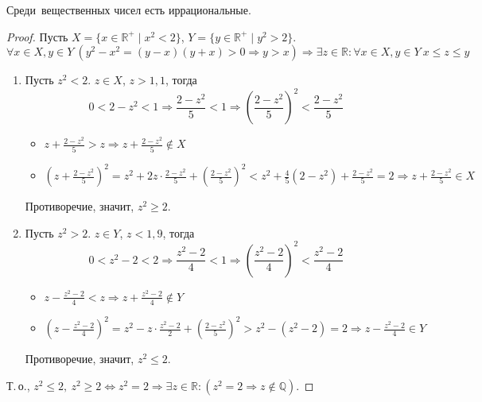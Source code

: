 \begin{statement}
Среди~вещественных чисел есть иррациональные.
\end{statement}
\begin{proof}
Пусть $X = \{ x \in \mathbb R^+ \mid x^2 < 2 \}$, $Y = \{ y \in \mathbb R^+ \mid y^2 > 2 \}$.
\begin{equation*}
\forall x \in X, y \in Y \ (y^2 - x^2 = (y - x)(y + x) > 0 \Rightarrow y > x) \Rightarrow
\exists z \in \mathbb R \colon \forall x \in X, y \in Y \ x \leqslant z \leqslant y
\end{equation*}

\begin{enumerate}
	\item Пусть $z^2 < 2$. $z \in X$, $z > 1{,}1$, тогда
	\begin{equation*}
	0 < 2 - z^2 < 1 \Rightarrow \frac{2 - z^2}5 < 1 \Rightarrow
	\left( \frac{2 - z^2}5 \right)^2 < \frac{2 - z^2}5
	\end{equation*}
	
	\begin{itemize}
		\item $\displaystyle z + \frac{2 - z^2}5 > z \Rightarrow z + \frac{2 - z^2}5 \notin X$
		
		\item $\displaystyle \left( z + \frac{2 - z^2}5 \right)^2 =
		z^2 + 2z\cdot\frac{2 - z^2}5 + \left( \frac{2 - z^2}5 \right)^2 <
		z^2 + \frac45 (2 - z^2) + \frac{2 - z^2}5 = 2 \Rightarrow z + \frac{2 - z^2}5 \in X$
	\end{itemize}
	Противоречие, значит, $z^2 \geqslant 2$.
	
	\item Пусть $z^2 > 2$. $z \in Y$, $z < 1{,}9$, тогда
	\begin{equation*}
	0 < z^2 - 2 < 2 \Rightarrow \frac{z^2 - 2}4 < 1 \Rightarrow
	\left( \frac{z^2 - 2}4 \right)^2 < \frac{z^2 - 2}4
	\end{equation*}
	
	\begin{itemize}
		\item $\displaystyle z - \frac{z^2 - 2}4 < z \Rightarrow z + \frac{z^2 - 2}4 \notin Y$
		
		\item $\displaystyle \left( z - \frac{z^2 - 2}4 \right)^2 =
		z^2 - z\cdot\frac{z^2 - 2}2 + \left( \frac{2 - z^2}5 \right)^2 >
		z^2 - (z^2 - 2) = 2 \Rightarrow z - \frac{z^2 - 2}4 \in Y$
	\end{itemize}
	
	Противоречие, значит, $z^2 \leqslant 2$.
\end{enumerate}

Т.\,о., $z^2 \leqslant 2, \ z^2 \geqslant 2 \Leftrightarrow z^2 = 2 \Rightarrow
\exists z \in \mathbb R \colon (z^2 = 2 \Rightarrow z \notin \mathbb Q)$.
\end{proof}